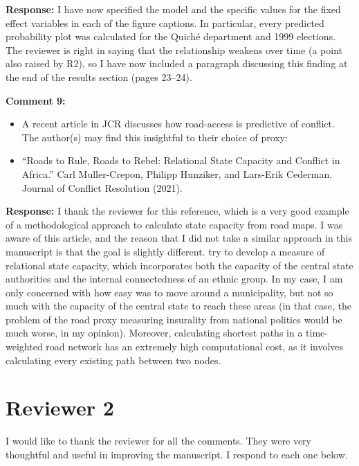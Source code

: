 \documentclass[12pt, a4paper, notitlepage]{article}
\begin{document}
\noindent\textbf{Response:} I have now specified the model and the specific values for the fixed effect variables in each of the figure captions. In particular, every predicted probability plot was calculated for the Quiché department and 1999 elections. The reviewer is right in saying that the relationship weakens over time (a point also raised by R2), so I have now included a paragraph discussing this finding at the end of the results section (pages 23--24).

\vspace{15pt}
\noindent\textbf{Comment 9:}
\begin{displayquote}
\begin{itemize}
\item A recent article in JCR discusses how road-access is predictive of conflict. The author(s) may find this insightful to their choice of proxy:
\item[] ``Roads to Rule, Roads to Rebel: Relational State Capacity and Conflict in Africa.'' Carl Muller-Crepon, Philipp Hunziker, and Lars-Erik Cederman. Journal of Conflict Resolution (2021).
\end{itemize}
\end{displayquote}

\noindent\textbf{Response:} I thank the reviewer for this reference, which is a very good example of a methodological approach to calculate state capacity from road maps. I was aware of this article, and the reason that I did not take a similar approach in this manuscript is that the goal is slightly different. \citet{Muller-Crepon:2021va} try to develop a measure of relational state capacity, which incorporates both the capacity of the central state authorities and the internal connectedness of an ethnic group. In my case, I am only concerned with how easy was to move around a municipality, but not so much with the capacity of the central state to reach these areas (in that case, the problem of the road proxy measuring insurality from national politics would be much worse, in my opinion). Moreover, calculating shortest paths in a time-weighted road network has an extremely high computational cost, as it involves calculating every existing path between two nodes.

\newpage
\section*{Reviewer 2}

I would like to thank the reviewer for all the comments. They were very thoughtful and useful in improving the manuscript. I respond to each one below.
\end{document}
